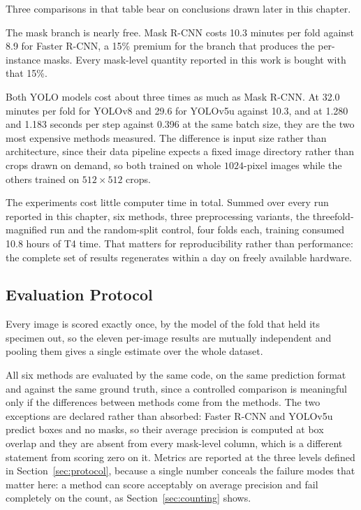 
Three comparisons in that table bear on conclusions drawn later in this chapter.

The mask branch is nearly free. Mask R-CNN costs 10.3 minutes per fold
against 8.9 for Faster R-CNN, a 15\% premium for the branch that produces the
per-instance masks. Every mask-level quantity reported in this work is bought with
that 15\%.

Both YOLO models cost about three times as much as Mask R-CNN. At 32.0
minutes per fold for YOLOv8 and 29.6 for YOLOv5u against 10.3, and at 1.280 and
1.183 seconds per step against 0.396 at the same batch size, they are the two most
expensive methods measured. The difference is input size rather than architecture,
since their data pipeline expects a fixed image directory rather than crops drawn
on demand, so both trained on whole $1024$-pixel images while the others
trained on $512 \times 512$ crops.

The experiments cost little computer time in total. Summed over every run
reported in this chapter, six methods, three preprocessing variants, the
threefold-magnified run and the random-split control, four folds each, training
consumed 10.8 hours of T4 time. That matters for reproducibility rather than performance: the complete set
of results regenerates within a day on freely available hardware.

\subsection{Evaluation Protocol}

Every image is scored exactly once, by the model of the fold that held its
specimen out, so the eleven per-image results are mutually independent and pooling
them gives a single estimate over the whole dataset.

All six methods are evaluated by the same code, on the same prediction format and
against the same ground truth, since a controlled comparison is meaningful only if
the differences between methods come from the methods. The two exceptions are
declared rather than absorbed: Faster R-CNN and YOLOv5u predict boxes and no
masks, so their average precision is computed at box overlap and they are absent
from every mask-level column, which is a different statement from scoring zero on
it. Metrics are reported at the three levels defined in
Section~\ref{sec:protocol}, because a single number conceals the failure modes
that matter here: a method can score acceptably on average precision and fail
completely on the count, as Section~\ref{sec:counting} shows.

